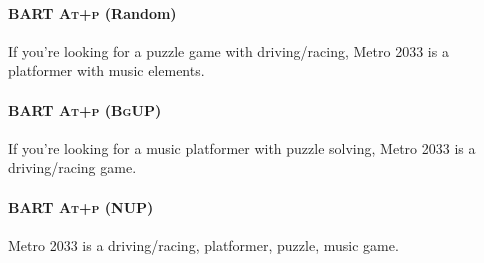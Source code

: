 \paragraph{BART \textsc{At+p} (Random)}
If you're looking for a puzzle game with driving/racing, Metro 2033 is a platformer with music elements.

\paragraph{BART \textsc{At+p (BgUP)}}
If you're looking for a music platformer with puzzle solving, Metro 2033 is a driving/racing game.

\paragraph{BART \textsc{At+p} (NUP)}
Metro 2033 is a driving/racing, platformer, puzzle, music game.


\clearpage

